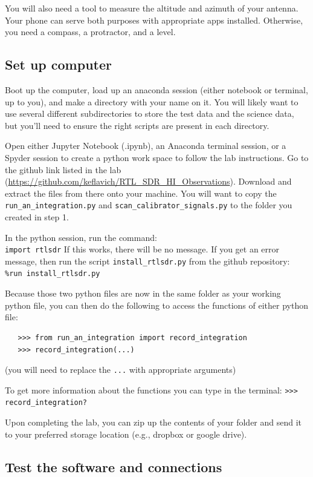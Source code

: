 \documentclass[11pt]{article}
\begin{document}
You will also need a tool to measure the altitude and azimuth of your antenna.
Your phone can serve both purposes with appropriate apps installed.
Otherwise, you need a compass, a protractor, and a level.



\subsection{Set up computer}
\label{sec:computer}
Boot up the computer, load up an anaconda session (either notebook or terminal,
up to you), and make a directory with your name on it.  You will likely want to
use several different subdirectories to store the test data and the science
data, but you'll need to ensure the right scripts are present in each
directory.

Open either Jupyter Notebook (.ipynb), an Anaconda terminal session, or a
Spyder session to create a python work space to follow the lab instructions.
Go to the github link listed in the lab
(\url{https://github.com/keflavich/RTL_SDR_HI_Observations}). Download and
extract the files from there onto your machine. You will want to copy the
\verb|run_an_integration.py| and \verb|scan_calibrator_signals.py| to the
folder you created in step 1. 

In the python session, run the command: \\
\verb|import rtlsdr|
If this works, there will be no message.  If you get an error message, then
run the script \verb|install_rtlsdr.py| from the github repository:\\
\verb|%run install_rtlsdr.py|

Because those two python files are now in the same folder as your working
python file, you can then do the following to access the functions of either
python file:
\begin{verbatim}
   >>> from run_an_integration import record_integration
   >>> record_integration(...)
\end{verbatim}
(you will need to replace the \verb|...| with appropriate arguments)

To get more information about the functions you can type in the terminal:
   \verb|>>> record_integration?|

Upon completing the lab, you can zip up the contents of your folder and send it
to your preferred storage location (e.g., dropbox or google drive).


\subsection{Test the software and connections}
\end{document}
